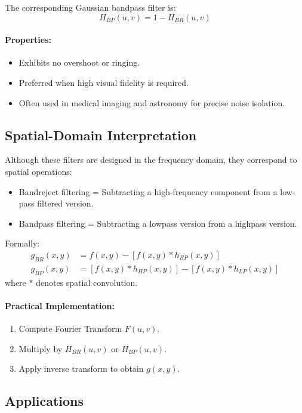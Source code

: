 \documentclass[12pt,a4paper]{AnantDocumentation}
\begin{document}
The corresponding Gaussian bandpass filter is:
\begin{equation}
H_{BP}(u, v) = 1 - H_{BR}(u, v)
\end{equation}

\paragraph{Properties:}
\begin{itemize}
\item Exhibits no overshoot or ringing.
\item Preferred when high visual fidelity is required.
\item Often used in medical imaging and astronomy for precise noise isolation.
\end{itemize}

\subsection{Spatial-Domain Interpretation}

Although these filters are designed in the frequency domain, they correspond to spatial operations:
\begin{itemize}
\item Bandreject filtering = Subtracting a high-frequency component from a low-pass filtered version.
\item Bandpass filtering = Subtracting a lowpass version from a highpass version.
\end{itemize}

Formally:
\begin{align}
g_{BR}(x, y) &= f(x, y) - [f(x, y) * h_{BP}(x, y)] \\
g_{BP}(x, y) &= [f(x, y) * h_{HP}(x, y)] - [f(x, y) * h_{LP}(x, y)]
\end{align}
where $*$ denotes spatial convolution.

\paragraph{Practical Implementation:}
\begin{enumerate}
\item Compute Fourier Transform $F(u, v)$.
\item Multiply by $H_{BR}(u, v)$ or $H_{BP}(u, v)$.
\item Apply inverse transform to obtain $g(x, y)$.
\end{enumerate}

\subsection{Applications}
\end{document}
